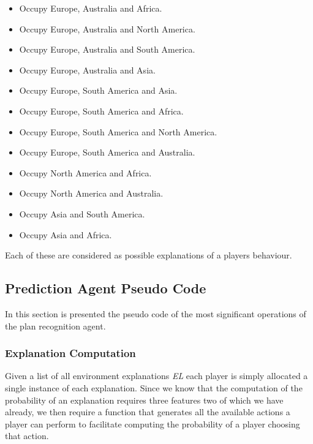 \documentclass[parskip]{cs4rep}
\begin{document}
\begin{itemize}
\item
Occupy Europe, Australia and Africa.
\item
Occupy Europe, Australia and North America.
\item
Occupy Europe, Australia and South America.
\item
Occupy Europe, Australia and Asia.
\item
Occupy Europe, South America and Asia.
\item
Occupy Europe, South America and Africa.
\item
Occupy Europe, South America and North America.
\item
Occupy Europe, South America and Australia.
\item
Occupy North America and Africa.
\item
Occupy North America and Australia.
\item
Occupy Asia and South America.
\item
Occupy Asia and Africa.
\newline
\end{itemize}

Each of these are considered as possible explanations of a players behaviour.

\subsection{Prediction Agent Pseudo Code}

In this section is presented the pseudo code of the most significant operations of the plan recognition agent.

\subsubsection{Explanation Computation}

Given a list of all environment explanations \textit{EL} each player is simply allocated a single instance of each explanation. Since we know that the computation of the probability of an explanation requires three features two of which we have already, we then require a function that generates all the available actions a player can perform to facilitate computing the probability of a player choosing that action.
\end{document}
